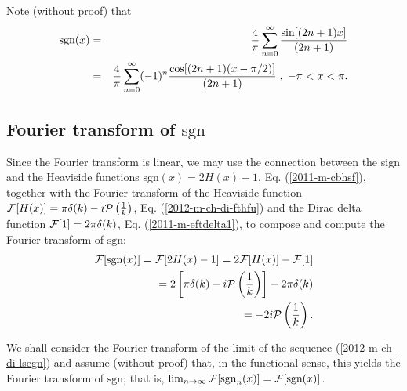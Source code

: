 Note (without proof) that
\begin{eqnarray}
\mbox{sgn}(x)
&=&{4\over \pi }\sum_{n=0}^\infty {\sin [
(2n+1)x]\over
(2n+1)}\\
&=&{4\over \pi }\sum_{n=0}^\infty (-1)^n{\cos [
(2n+1)(x-\pi /2)]\over
(2n+1)}\;,\; -\pi <x<\pi  .
 \end{eqnarray}




\subsection{Fourier transform of $\textrm{sgn}$}

Since the Fourier transform is linear,
we may use the connection between the sign and the Heaviside functions $\textrm{sgn}(x) = 2H(x) -1$, Eq. (\ref{2011-m-cbhsf}),
together with the
Fourier transform of the Heaviside function
${\cal F}[H(x)] =  \pi \delta (k)   -i {\cal P} \left(\frac{1}{k}\right)$,
Eq. (\ref{2012-m-ch-di-fthfu}) and the Dirac delta function
${\cal F}[1] = 2\pi \delta (k)$, Eq. (\ref{2011-m-eftdelta1}),
to compose and compute the Fourier transform  of $\textrm{sgn}$:
\begin{equation}
\begin{split}
{\cal F}[\textrm{sgn}(x)] = {\cal F}[2H(x) -1] = 2{\cal F}[H(x)] - {\cal F}[1]
\\ \qquad =
2 \left[\pi \delta (k)   -i {\cal P} \left(\frac{1}{k}\right)\right] -  2\pi \delta (k)
\\ \qquad =
-2i {\cal P} \left(\frac{1}{k}\right)
.
\end{split}
\label{2011-m-ch-di-fdsgnfu}
\end{equation}

We shall consider the Fourier transform of the limit of the sequence (\ref{2012-m-ch-di-lsegn})
and assume (without proof) that, in the functional sense,
this yields the   Fourier transform of $\textrm{sgn}$; that is,
$
\lim_{n\rightarrow \infty}
{\cal F}[ \textrm{sgn}_n(x) ]
=
{\cal F}[ \textrm{sgn}(x) ]
$.


